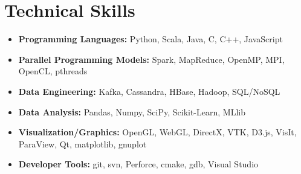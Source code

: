 \section{Technical Skills}

\begin{itemize}

\item \textbf{Programming Languages:} Python, Scala, Java, C, C++, JavaScript

\item \textbf{Parallel Programming Models:} Spark, MapReduce, OpenMP, MPI, OpenCL, pthreads

\item \textbf{Data Engineering:} Kafka, Cassandra, HBase, Hadoop, SQL/NoSQL

\item \textbf{Data Analysis:} Pandas, Numpy, SciPy, Scikit-Learn, MLlib

\item \textbf{Visualization/Graphics:} OpenGL, WebGL, DirectX, VTK, D3.js, VisIt, ParaView, Qt, matplotlib, gnuplot

\item \textbf{Developer Tools:} git, svn, Perforce, cmake, gdb, Visual Studio

\end{itemize}

